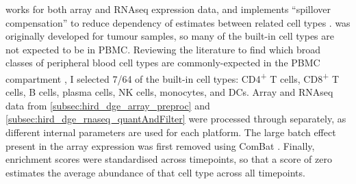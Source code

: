 works for both array and \gls{RNAseq} expression data,
and implements \enquote{spillover compensation} to reduce dependency of estimates between related cell types \autocite{aran2017XCellDigitallyPortraying}.
%
%
 was originally developed for tumour samples, so many of the built-in cell types are not expected to be in \gls{PBMC}.
Reviewing the literature to find which broad classes of peripheral blood cell types are commonly-expected in the \gls{PBMC} compartment \autocite{kleiveland2015PeripheralBloodMononuclear,vanderwijst2018SinglecellRNASequencing,davenport2018DiscoveringVivoCytokineeQTL},
I selected 7/64 of the built-in cell types: CD4\textsuperscript{+} T cells, CD8\textsuperscript{+} T cells, B cells, plasma cells, \gls{NK} cells, monocytes, and \glspl{DC}.
Array and \gls{RNAseq} data from \cref{subsec:hird_dge_array_preproc} and \cref{subsec:hird_dge_rnaseq_quantAndFilter} were processed through  separately, as different internal parameters are used for each platform.
The large batch effect present in the array expression was first removed using ComBat \autocite{johnson2007AdjustingBatchEffects}.
Finally, enrichment scores were standardised across timepoints, so that a score of zero estimates the average abundance of that cell type across all timepoints.

%

